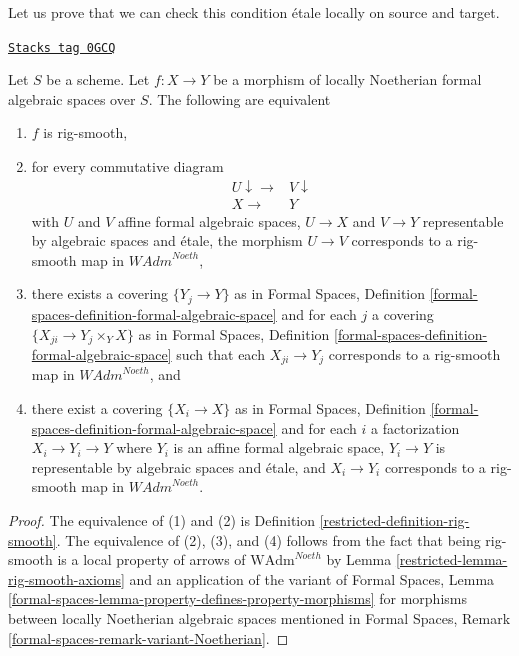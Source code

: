 Let us prove that we can check this condition \'etale locally on
source and target.

\begin{lemma}
\label{restricted-lemma-rig-smooth-morphisms}
\href{https://stacks.math.columbia.edu/tag/0GCQ}{\texttt{Stacks tag 0GCQ}}

Let $S$ be a scheme. Let $f : X \to Y$ be a morphism of
locally Noetherian formal algebraic spaces over $S$.
The following are equivalent
\begin{enumerate}
\item $f$ is rig-smooth,
\item for every commutative diagram
$$
\begin{array}{cc}U \downarrow\longrightarrow & V \downarrow \\ X \longrightarrow & Y\end{array}
$$
with $U$ and $V$ affine formal algebraic spaces, $U \to X$ and $V \to Y$
representable by algebraic spaces and \'etale, the morphism $U \to V$
corresponds to a rig-smooth map in $\textit{WAdm}^{Noeth}$,
\item there exists a covering $\{Y_j \to Y\}$ as in
Formal Spaces,
Definition \ref{formal-spaces-definition-formal-algebraic-space}
and for each $j$
a covering $\{X_{ji} \to Y_j \times_Y X\}$ as in
Formal Spaces,
Definition \ref{formal-spaces-definition-formal-algebraic-space}
such that each $X_{ji} \to Y_j$  corresponds
to a rig-smooth map in $\textit{WAdm}^{Noeth}$, and
\item there exist a covering $\{X_i \to X\}$ as in
Formal Spaces,
Definition \ref{formal-spaces-definition-formal-algebraic-space}
and for each $i$ a factorization $X_i \to Y_i \to Y$ where $Y_i$
is an affine formal algebraic space, $Y_i \to Y$ is representable
by algebraic spaces and \'etale, and $X_i \to Y_i$ corresponds
to a rig-smooth map in $\textit{WAdm}^{Noeth}$.
\end{enumerate}
\end{lemma}

\begin{proof}

The equivalence of (1) and (2) is Definition \ref{restricted-definition-rig-smooth}.
The equivalence of (2), (3), and (4) follows from the fact that
being rig-smooth is a local property of arrows of
$\text{WAdm}^{Noeth}$ by Lemma \ref{restricted-lemma-rig-smooth-axioms}
and an application of the variant of
Formal Spaces, Lemma
\ref{formal-spaces-lemma-property-defines-property-morphisms}
for morphisms between locally Noetherian algebraic spaces
mentioned in
Formal Spaces, Remark
\ref{formal-spaces-remark-variant-Noetherian}.
\end{proof}

